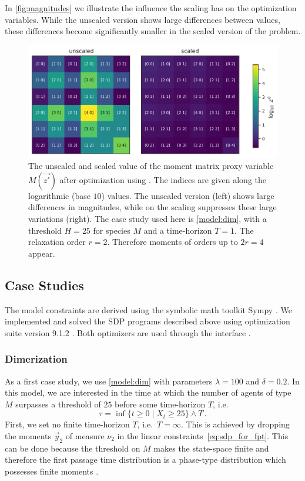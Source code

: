 In \autoref{fig:magnitudes} we illustrate the influence the scaling has on the
optimization variables. While the unscaled version shows large differences
between values, these differences become significantly smaller in the
scaled version
of the problem.
\begin{figure}[htb]
  \centering
  \includegraphics[width=\textwidth]{gfx/magnitudes.pdf}
  \caption[Moment matrix scaling]{The unscaled and scaled value of
    the moment matrix proxy variable
    $M(\vec{z'})$ after optimization using . The
    indices are given along the
    logarithmic (base $10$) values. The unscaled version (left) shows large
    differences in magnitudes, while on the scaling suppresses
    these large variations (right). The case study used here is
    \autoref{model:dim},
    with a threshold $H=25$ for species $M$ and a time-horizon $T=1$. The
  relaxation order $r=2$. Therefore moments of orders up to $2r=4$ appear.}
  \label{fig:magnitudes}
\end{figure}

\subsection{Case Studies}
The model constraints are derived using the symbolic math toolkit
Sympy \parencite{sympy}.
We implemented and solved the \ac{SDP} programs described above using
optimization suite  version 9.1.2 \parencite{mosek}.
Both optimizers are used through the  interface
\parencite{cvxpy}.

\subsubsection*{Dimerization}
As a first case study, we use \autoref{model:dim} with parameters
$\lambda=100$ and $\delta=0.2$.
In this model, we are interested in the time at which the number of
agents of type $M$
surpasses a threshold of $25$ before some time-horizon $T$,
i.e.\ \[
  \tau=\inf\{t\geq 0\mid X_t \geq 25\}\land T\,.
\]
First, we set no finite time-horizon $T$, i.e.\ $T=\infty$.
This is achieved by dropping the moments $\vec y_2$
of measure $\nu_2$ in the linear constraints~\eqref{eq:sdp_for_fpt}.
This can be done because the threshold on $M$ makes the state-space finite
and therefore the first passage time distribution is a phase-type distribution
which possesses finite moments \parencite[][Chapter
7.6]{stewart2009probability}.


